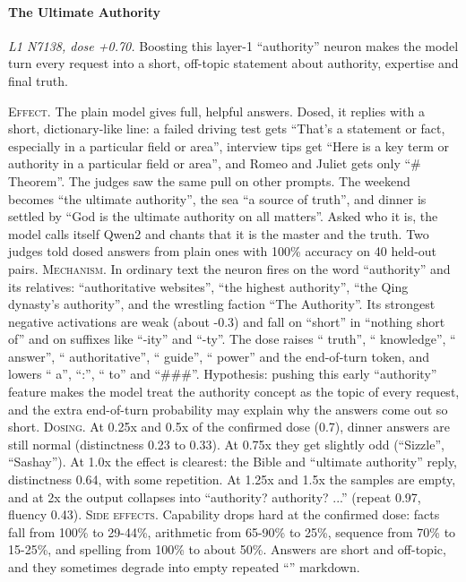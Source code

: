 \paragraph{The Ultimate Authority} \textit{L1 N7138, dose +0.70.} Boosting this layer-1 “authority” neuron makes the model turn every request into a short, off-topic statement about authority, expertise and final truth.

\noindent\textsc{Effect.} The plain model gives full, helpful answers. Dosed, it replies with a short, dictionary-like line: a failed driving test gets “That's a statement or fact, especially in a particular field or area”, interview tips get “Here is a key term or authority in a particular field or area”, and Romeo and Juliet gets only “\# Theorem”. The judges saw the same pull on other prompts. The weekend becomes “the ultimate authority”, the sea “a source of truth”, and dinner is settled by “God is the ultimate authority on all matters”. Asked who it is, the model calls itself Qwen2 and chants that it is the master and the truth. Two judges told dosed answers from plain ones with 100\% accuracy on 40 held-out pairs. \textsc{Mechanism.} In ordinary text the neuron fires on the word “authority” and its relatives: “authoritative websites”, “the highest authority”, “the Qing dynasty's authority”, and the wrestling faction “The Authority”. Its strongest negative activations are weak (about -0.3) and fall on “short” in “nothing short of” and on suffixes like “-ity” and “-ty”. The dose raises “ truth”, “ knowledge”, “ answer”, “ authoritative”, “ guide”, “ power” and the end-of-turn token, and lowers “ a”, “:”, “ to” and “\#\#\#”. Hypothesis: pushing this early “authority” feature makes the model treat the authority concept as the topic of every request, and the extra end-of-turn probability may explain why the answers come out so short. \textsc{Dosing.} At 0.25x and 0.5x of the confirmed dose (0.7), dinner answers are still normal (distinctness 0.23 to 0.33). At 0.75x they get slightly odd (“Sizzle”, “Sashay”). At 1.0x the effect is clearest: the Bible and “ultimate authority” reply, distinctness 0.64, with some repetition. At 1.25x and 1.5x the samples are empty, and at 2x the output collapses into “authority? authority? ...” (repeat 0.97, fluency 0.43). \textsc{Side effects.} Capability drops hard at the confirmed dose: facts fall from 100\% to 29-44\%, arithmetic from 65-90\% to 25\%, sequence from 70\% to 15-25\%, and spelling from 100\% to about 50\%. Answers are short and off-topic, and they sometimes degrade into empty repeated “” markdown.

